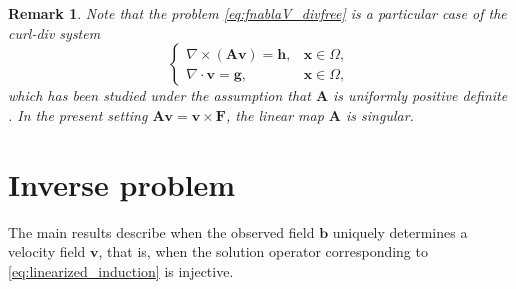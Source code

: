 \documentclass[12pt]{article}
\newtheorem{remark}{Remark}
\begin{document}
\begin{remark}
			Note that the problem \eqref{eq:fnablaV_divfree} is a particular case of the curl-div system
			\begin{equation}
				\left\{ 
				\begin{array}{ll}
					\nabla \times (\boldsymbol{A}\boldsymbol{v}) = \boldsymbol{h}, & \boldsymbol{x} \in \Omega, \\
					\nabla \cdot \boldsymbol{v} = \boldsymbol{g}, & \boldsymbol{x} \in \Omega,
				\end{array}
				\right.
				\label{singular_system}
			\end{equation}
			which has been studied under the assumption that $\boldsymbol{A}$ is uniformly positive definite \cite{alonso2019curl}. In the present setting $\boldsymbol{A}\boldsymbol{v} = {{} \boldsymbol{v}\times \mathbf{F}}$, the linear map $\boldsymbol{A}$ is singular.
            
		\end{remark}

\section{Inverse problem}\label{sec:inverseproblem}

 The main results describe when the observed field $\boldsymbol{b} $ uniquely determines a velocity field $\boldsymbol{v}$, that is, when the solution operator corresponding to \eqref{eq:linearized_induction} is injective. 
\end{document}
